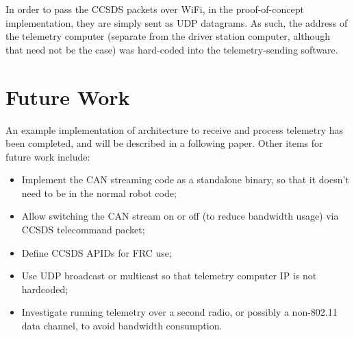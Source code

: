 \documentclass[12pt]{article}
\begin{document}
\par In order to pass the CCSDS packets over WiFi, in the proof-of-concept implementation, they are simply sent as UDP datagrams. As such, the address of the telemetry computer (separate from the driver station computer, although that need not be the case) was hard-coded into the telemetry-sending software. 

\section{Future Work}
\par An example implementation of architecture to receive and process telemetry has been completed, and will be described in a following paper. Other items for future work include:
\begin{itemize}
	\item Implement the CAN streaming code as a standalone binary, so that it doesn't need to be in the normal robot code;
	\item Allow switching the CAN stream on or off (to reduce bandwidth usage) via CCSDS telecommand packet;
	\item Define CCSDS APIDs for FRC use;
	\item Use UDP broadcast or multicast so that telemetry computer IP is not hardcoded;
	\item Investigate running telemetry over a second radio, or possibly a non-802.11 data channel, to avoid bandwidth consumption.
\end{itemize}

\newpage
\appendix
\end{document}
